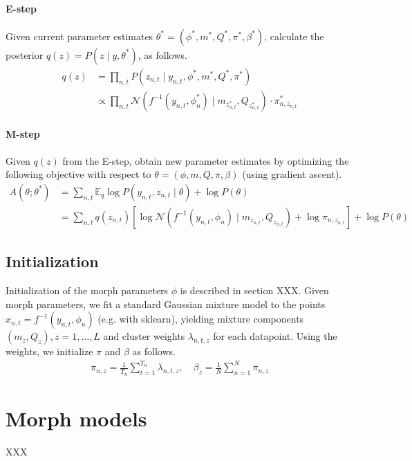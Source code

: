\documentclass{article}         %
\newcommand{\EE}{\mathbb{E}}
\newcommand{\NN}{\mathcal{N}}
\begin{document}
\paragraph{E-step} Given current parameter estimates $\theta^* = (\phi^*, m^*, Q^*, \pi^*, \beta^*)$, calculate the posterior $q(z) = P(z \mid y, \theta^*)$, as follows.
%
\begin{align}
    q(z) & = \prod_{n,t} P(z_{n,t} \mid y_{n,t}, \phi^*, m^*, Q^*, \pi^*) \\
    & \propto  \prod_{n,t}  \NN(f^{-1}(y_{n,t}, \phi^*_n) \mid m_{z_{n,t}^*}, Q_{z_{n,t}^*}) \cdot \pi_{n,z_{n,t}}^*
\end{align}

\paragraph{M-step} Given $q(z)$ from the E-step, obtain new parameter estimates by optimizing the following objective with respect to $\theta = (\phi, m, Q, \pi, \beta)$ (using gradient ascent).
\begin{align}
    A(\theta; \theta^*) & = \sum_{n,t} \EE_q \log P(y_{n,t}, z_{n,t} \mid \theta) + \log P(\theta) \\
    & =  \sum_{n,t} q(z_{n,t}) \left[ \log \NN(f^{-1}(y_{n,t}, \phi_n) \mid m_{z_{n,t}}, Q_{z_{n,t}}) + \log \pi_{n, z_{n, t}} \right] + \log P(\theta)
\end{align}

\subsection{Initialization}
Initialization of the morph parameters $\phi$ is described in section XXX. Given morph parameters, we fit a standard Gaussian mixture model to the points $x_{n,t} = f^{-1}(y_{n,t}, \phi_n)$ (e.g. with sklearn), yielding mixture components $(m_z, Q_z), z=1,...,L$ and cluster weights $\lambda_{n,t,z}$ for each datapoint. Using the weights, we initialize $\pi$ and $\beta$ as follows.
\begin{align}
    \pi_{n,z} = \frac{1}{T_n} \sum_{t=1}^{T_n} \lambda_{n,t,z}, \quad \beta_z = \frac{1}{N} \sum_{n=1}^N \pi_{n,z}
\end{align}

\section{Morph models}

XXX
\end{document}
